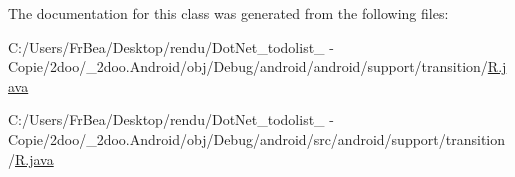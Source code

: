 The documentation for this class was generated from the following files:\begin{CompactItemize}
\item 
C:/Users/FrBea/Desktop/rendu/DotNet\_\-todolist\_ - Copie/2doo/\_\-2doo.Android/obj/Debug/android/android/support/transition/\hyperlink{android_2support_2transition_2_r_8java}{R.java}\item 
C:/Users/FrBea/Desktop/rendu/DotNet\_\-todolist\_ - Copie/2doo/\_\-2doo.Android/obj/Debug/android/src/android/support/transition/\hyperlink{src_2android_2support_2transition_2_r_8java}{R.java}\end{CompactItemize}
